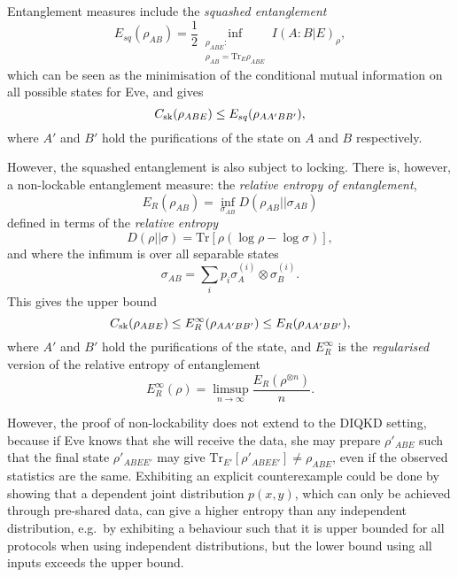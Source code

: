 \documentclass[10pt, a4paper]{article}
\numberwithin{equation}{section} %
\theoremstyle{definition}
\theoremstyle{plain}
\newcommand{\?}{\mathrel{?}} %
\newcommand{\Tr}{\mathrm{Tr}} %
\newcommand{\sk}{\rm sk}
\begin{document}
      Entanglement measures include the \emph{squashed entanglement}
      \begin{equation}
        E_{sq}(\rho_{A B}) = \frac{1}{2} \inf_{\substack{\rho_{A BE} : \\ \rho_{A B} = \Tr_E \rho_{A BE}}} I(A:B|E)_{\rho},
      \end{equation}
      which can be seen as the minimisation of the conditional mutual information on all possible states for Eve, and gives
      \begin{equation}
        C_{\sk}(\rho_{A B E}) \leq E_{sq}(\rho_{A A' B B'}),
      \end{equation}
      where \(A'\) and \(B'\) hold the purifications of the state on \(A\) and \(B\) respectively.

      However, the squashed entanglement is also subject to locking. There is, however, a non-lockable entanglement measure: the \emph{relative entropy of entanglement},  
      \begin{equation}
        E_R\left({\rho_{AB}}\right) = \inf_{\sigma_{AB}} D(\rho_{AB}||\sigma_{AB})
      \end{equation}
      defined in terms of the \emph{relative entropy}
      \begin{equation}
        D(\rho||\sigma) = \Tr\left[ \rho (\log \rho - \log \sigma) \right],
      \end{equation}
      and where the infimum is over all separable states
      \begin{equation}
        \sigma_{AB} = \sum_i p_i \sigma_{A}^{(i)} \otimes \sigma_{B}^{(i)}.
      \end{equation}
      This gives the upper bound
      \begin{equation}
        C_{\sk}(\rho_{A B E}) \leq E_{R}^{\infty}(\rho_{A A' B B'}) \leq E_{R}(\rho_{A A' B B'}),
      \end{equation}
      where \(A'\) and \(B'\) hold the purifications of the state, and \(E_{R}^{\infty}\) is the \emph{regularised} version of the relative entropy of entanglement
      \begin{equation}
        E_{R}^{\infty}(\rho) = \limsup_{n\to\infty} \frac{E_R(\rho^{\otimes n})}{n}.
      \end{equation}

        However, the proof of non-lockability does not extend to the DIQKD setting, because if Eve knows that she will receive the data, she may prepare \(\rho'_{ABE}\) such that the final state \(\rho'_{ABEE'}\) may give \(\Tr_{E'}[\rho'_{ABEE'}] \neq \rho_{ABE}\), even if the observed statistics are the same. Exhibiting an explicit counterexample could be done by showing that a dependent joint distribution \(p(x,y)\), which can only be achieved through pre-shared data, can give a higher entropy than any independent distribution, e.g.\ by exhibiting a behaviour such that it is upper bounded for all protocols when using independent distributions, but the lower bound using all inputs exceeds the upper bound.
\end{document}
